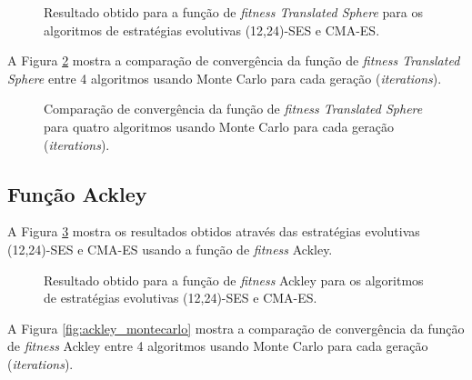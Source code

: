 \documentclass[brazil, 12pt]{article}
\begin{document}
\begin{figure}[H]
	\centering
	\caption{Resultado obtido para a função de \textit{fitness Translated Sphere} para os algoritmos de estratégias evolutivas (12,24)-SES e CMA-ES.}
	\label{fig:translated_sphere}
\end{figure}

A Figura \ref{fig:translated_sphere_montecarlo} mostra a comparação de convergência da função de \textit{fitness Translated Sphere} entre 4 algoritmos usando Monte Carlo para cada geração (\textit{iterations}).

\begin{figure}[H]
	\centering
	\caption{Comparação de convergência da função de \textit{fitness Translated Sphere} para quatro algoritmos usando Monte Carlo para cada geração (\textit{iterations}).}
	\label{fig:translated_sphere_montecarlo}
\end{figure}

\subsection{Função Ackley}
A Figura \ref{fig:ackley} mostra os resultados obtidos através das estratégias evolutivas (12,24)-SES e CMA-ES usando a função de \textit{fitness} Ackley.

\begin{figure}[H]
	\centering
	\caption{Resultado obtido para a função de \textit{fitness} Ackley para os algoritmos de estratégias evolutivas (12,24)-SES e CMA-ES.}
	\label{fig:ackley}
\end{figure}

A Figura \ref{fig:ackley_montecarlo} mostra a comparação de convergência da função de \textit{fitness} Ackley entre 4 algoritmos usando Monte Carlo para cada geração (\textit{iterations}).
\end{document}
